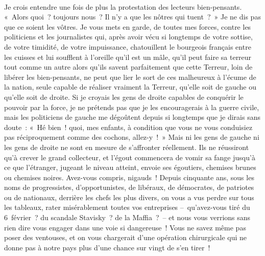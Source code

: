 \documentclass[french,twoside]{book} %
\newcommand{\astertri}{\medskip\par\centerline{\color{rubric}\large\selectfont{\syms ✻\,✻\,✻}}\medskip\par}%
\begin{document}
\astertri

\noindent  \par
Je crois entendre une fois de plus la protestation des lecteurs bien-pensants. « Alors quoi ? toujours nous ? Il n’y a que les nôtres qui tuent ? » Je ne dis pas que ce soient les vôtres. Je vous mets en garde, de toutes mes forces, contre les politiciens et les journalistes qui, après avoir vécu si longtemps de votre sottise, de votre timidité, de votre impuissance, chatouillent le bourgeois français entre les cuisses et lui soufflent à l’oreille qu’il est un mâle, qu’il peut faire sa terreur tout comme un autre alors qu’ils savent parfaitement que cette Terreur, loin de libérer les bien-pensants, ne peut que lier le sort de ces malheureux à l’écume de la nation, seule capable de réaliser vraiment la Terreur, qu’elle soit de gauche ou qu’elle soit de droite. Si je croyais les gens de droite capables de conquérir le pouvoir par la force, je ne prétends pas que je les encouragerais à la guerre civile, mais les politiciens de gauche me dégoûtent depuis si longtemps que je dirais sans doute : « Hé bien ! quoi, mes enfants, à condition que vous ne vous conduisiez pas réciproquement comme des cochons, allez-y ! » Mais ni les gens de gauche ni les gens de droite ne sont en mesure de s’affronter réellement. Ils ne réussiront qu’à crever le grand collecteur, et l’égout commencera de vomir sa fange jusqu’à ce que l’étranger, jugeant le niveau atteint, envoie ses égoutiers, chemises brunes ou chemises noires. Avez-vous compris, nigauds ! Depuis cinquante ans, sous les noms de progressistes, d’opportunistes, de libéraux, de démocrates, de patriotes ou de nationaux, derrière les chefs les plus divers, on vous a vus perdre sur tous les tableaux, rater misérablement toutes vos entreprises – qu’avez-vous tiré du 6 février ? du scandale Stavisky ? de la Maffia ? – et nous vous verrions sans rien dire vous engager dans une voie si dangereuse ! Vous ne savez même pas poser des ventouses, et on vous chargerait d’une opération chirurgicale qui ne donne pas à notre pays plus d’une chance sur vingt de s’en tirer !\par
 \par

\astertri
\end{document}
